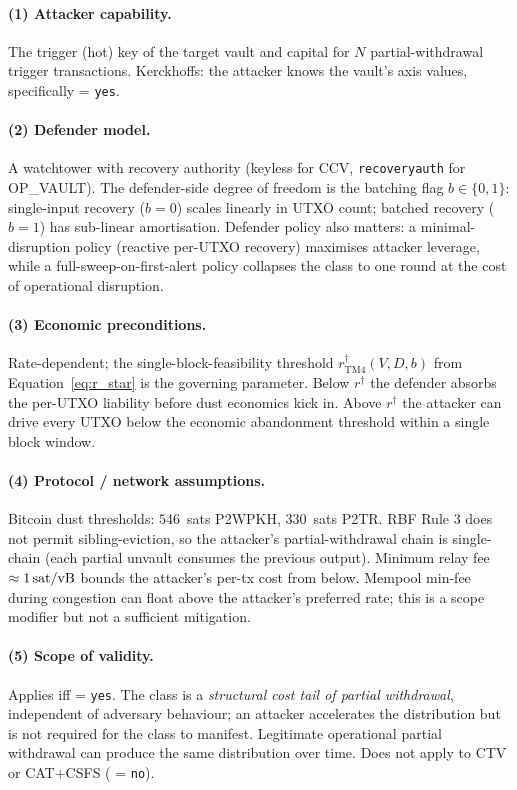 \paragraph{(1) Attacker capability.}
The trigger (hot) key of the target vault and capital for $N$
partial-withdrawal trigger transactions. Kerckhoffs: the attacker
knows the vault's axis values, specifically \axrevault{} =
\texttt{yes}.

\paragraph{(2) Defender model.}
A watchtower with recovery authority (keyless for CCV,
\texttt{recoveryauth} for OP\_VAULT). The defender-side degree of
freedom is the batching flag $b \in \{0, 1\}$: single-input
recovery ($b = 0$) scales linearly in UTXO count; batched recovery
($b = 1$) has sub-linear amortisation. Defender policy also matters:
a minimal-disruption policy (reactive per-UTXO recovery) maximises
attacker leverage, while a full-sweep-on-first-alert policy
collapses the class to one round at the cost of operational
disruption.

\paragraph{(3) Economic preconditions.}
Rate-dependent; the single-block-feasibility threshold
$r^\dagger_{\mathrm{TM4}}(V, D, b)$ from
Equation~\ref{eq:r_star} is the governing parameter. Below
$r^\dagger$ the defender absorbs the per-UTXO liability before dust
economics kick in. Above $r^\dagger$ the attacker can drive every
UTXO below the economic abandonment threshold within a single block
window.

\paragraph{(4) Protocol / network assumptions.}
Bitcoin dust thresholds: $546$~sats P2WPKH, $330$~sats P2TR. RBF
Rule 3 does not permit sibling-eviction, so the attacker's
partial-withdrawal chain is single-chain (each partial unvault
consumes the previous output). Minimum relay fee $\approx 1\,\text{sat/vB}{}$
bounds the attacker's per-tx cost from below. Mempool min-fee during
congestion can float above the attacker's preferred rate; this is a
scope modifier but not a sufficient mitigation.

\paragraph{(5) Scope of validity.}
Applies iff \axrevault{} = \texttt{yes}. The class is a
\emph{structural cost tail of partial withdrawal}, independent of
adversary behaviour; an attacker accelerates the distribution but
is not required for the class to manifest. Legitimate operational
partial withdrawal can produce the same distribution over time.
Does not apply to CTV or CAT+CSFS (\axrevault{} = \texttt{no}).

